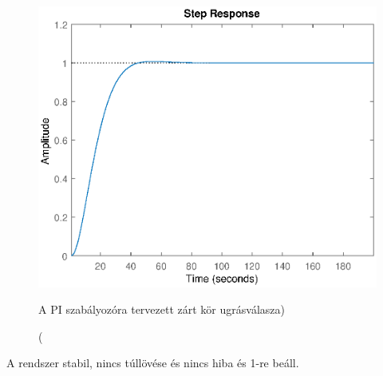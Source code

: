 \documentclass[12pt]{article}
\begin{document}
\begin{figure}[H]
\centering
\includegraphics[scale=.70]{WCPI}
\caption(A PI szabályozóra tervezett zárt kör ugrásválasza)
\end{figure}
A rendszer stabil, nincs túllövése és nincs hiba és 1-re beáll.
\end{document}

